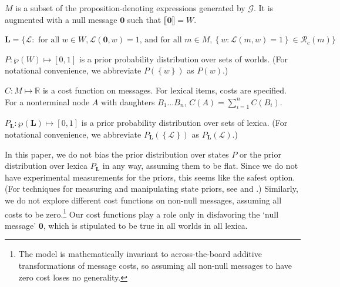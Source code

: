 \documentclass[leqno,12pt]{article}
\newcommand{\set}[1]{\ensuremath{\left\{ #1 \right\}}}
\newcommand{\Set}[1]{\ensuremath{\Big\{ #1 \Big\}}}
\newcommand{\Reals}{\mathbb{R}}
\newcommand{\sem}[1]{\ensuremath{\llbracket#1\rrbracket}}
\newcommand{\state}{w}
\newcommand{\Lex}{\mathcal{L}}
\newcommand{\LexSet}{\mathbf{L}}
\newcommand{\Messages}{M}
\newcommand{\msg}{m}
\newcommand{\Costs}{C}
\newcommand{\StatePrior}{P}
\newcommand{\LexPrior}{P_{\LexSet}}
\newcommand{\nullmsg}{\mathbf{0}}
\newcommand{\Grammar}{\mathcal{G}}
\newcommand{\Refine}[1][c]{\mathcal{R}_{#1}}
\newcommand{\Worlds}{W}
\begin{document}
{\begin{examples}
\item\label{modobjects}
  \begin{examples}
  \item\label{messages} $\Messages$ is a subset of the
    proposition-denoting expressions generated by $\Grammar$. It is
    augmented with a null message $\nullmsg$ such that
    $\sem{\nullmsg} = \Worlds$.

  \item\label{lexset}%
    $\LexSet = \Set{\Lex : \text{ for all } \state \in \Worlds, \Lex(\nullmsg, w)=1
      \text{, and for all } \msg \in \Messages, \set{\state : \Lex(\msg, \state)=1} \in \Refine(\msg)}$             
  
  \item $\StatePrior : \wp(\Worlds) \mapsto [0,1]$ is a prior
    probability distribution over sets of worlds.  (For notational
    convenience, we abbreviate $\StatePrior(\set{\state})$ as
    $\StatePrior(\state)$.)

  \item $\Costs : \Messages \mapsto \Reals$ is a cost function on
    messages.  For lexical items, costs are specified. For a
    nonterminal node $A$ with daughters $B_{1} \ldots B_{n}$,
    $\Costs(A) = \sum_{i=1}^{n}\Costs(B_{i})$.

  \item $\LexPrior : \wp(\LexSet) \mapsto [0,1]$ is a prior
    probability distribution over sets of lexica.  (For notational
    convenience, we abbreviate $\LexPrior(\set{\Lex})$ as 
    $\LexPrior(\Lex)$.)
  \end{examples}
\end{examples}

In this paper, we do not bias the prior distribution over states
$\StatePrior$ or the prior distribution over lexica $\LexPrior$ in any
way, assuming them to be flat. Since we do not have experimental
measurements for the priors, this seems like the safest option. (For
techniques for measuring and manipulating state priors, see
\citealt{Frank:Goodman:2012} and
\citealt{Stiller:Goodman:Frank:2011}.)  Similarly, we do not explore
different cost functions on non-null messages, assuming all costs to
be zero.\footnote{The model is mathematically invariant to
  across-the-board additive transformations of message costs, so
  assuming all non-null messages to have zero cost loses no
  generality.} Our cost functions play a role only in disfavoring the
`null message' $\nullmsg$, which is stipulated to be true in all
worlds in all lexica.

}
\end{document}
